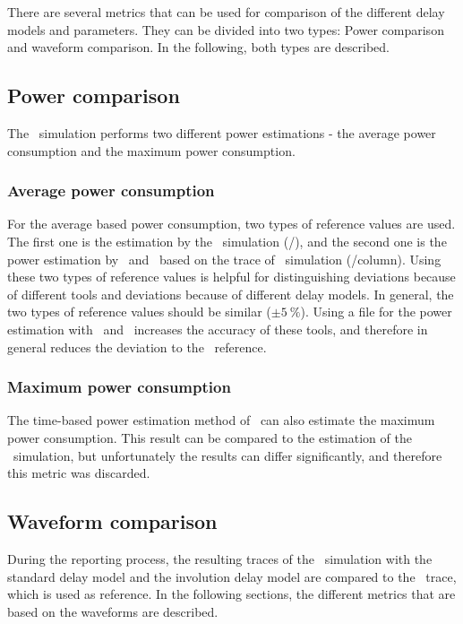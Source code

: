 
There are several metrics that can be used for comparison of the different 
delay models and parameters. They can be divided into two types: Power 
comparison and waveform comparison. In the following, both types are described.

\subsection{Power comparison}
\label{sec:man-evaluation-power-comparison}
The \spice\ simulation performs two different power estimations - the average 
power consumption and the maximum power consumption.

\subsubsection{Average power consumption}
For the average based power consumption, two types of reference values are 
used. The first one is the estimation by the \spice\ simulation 
(\spice/\spice), and the second 
one is the power estimation by \dc\ and \primetime\, based on the trace of 
\spice\ simulation (\spice/column). Using these two types of reference values 
is helpful for distinguishing deviations because of different tools and 
deviations because of different delay models. In general, the two types of 
reference values should be similar ($\pm \SI{5}{\percent}$). 
Using a  file for the power estimation with \dc\ and \primetime\ 
increases the accuracy of these tools, and therefore in general reduces the 
deviation to the \spice\ reference.

\subsubsection{Maximum power consumption}
\label{sec:man-evaluation-maximum-power-consumption}
The time-based power estimation method of \primetime\ can also estimate the 
maximum power consumption. This result can be compared to the estimation of the 
\spice\ simulation, but unfortunately the results can differ significantly, and 
therefore this metric was discarded.

\subsection{Waveform comparison}
\label{sec:man-evaluation-waveform-comparison}

During the reporting process, the resulting traces of the \modelsim\ simulation 
with the standard delay model and the involution delay model are compared to 
the \spice\ trace, which is used as reference. In the following sections, the 
different metrics that are based on the waveforms are described.

